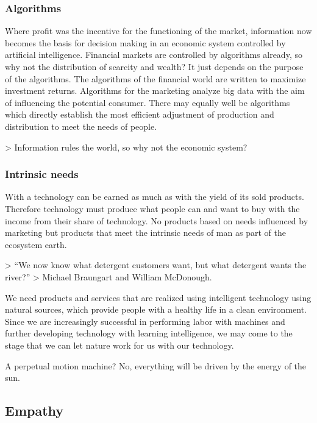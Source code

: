 \documentclass[11pt]{article}
\begin{document}
\subsubsection{Algorithms}
\label{sec:orgd5c7d94}

Where profit was the incentive for the functioning of the market, information now becomes the basis for decision making in an economic system controlled by artificial intelligence. Financial markets are controlled by algorithms already, so why not the distribution of scarcity and wealth? It just depends on the purpose of the algorithms. The algorithms of the financial world are written to maximize investment returns. Algorithms for the marketing analyze big data with the aim of influencing the potential consumer. There may equally well be algorithms which directly establish the most efficient adjustment of production and distribution to meet the needs of people.

> Information rules the world, so why not the economic system?

\subsubsection{Intrinsic needs}
\label{sec:orgbe38e75}

With a technology can be earned as much as with the yield of its sold products. Therefore technology must produce what people can and want to buy with the income from their share of technology. No products based on needs influenced by marketing but products that meet the intrinsic needs of man as part of the ecosystem earth.

> “We now know what detergent customers want, but what detergent wants the river?”
> Michael Braungart and William McDonough.

We need products and services that are realized using intelligent technology using natural sources, which provide people with a healthy life in a clean environment. Since we are increasingly successful in performing labor with machines and further developing technology with learning intelligence, we may come to the stage that we can let nature work for us with our technology.

A perpetual motion machine? No, everything will be driven by the energy of the sun.

\subsection{Empathy}
\label{sec:orgf362f6d}
\end{document}
